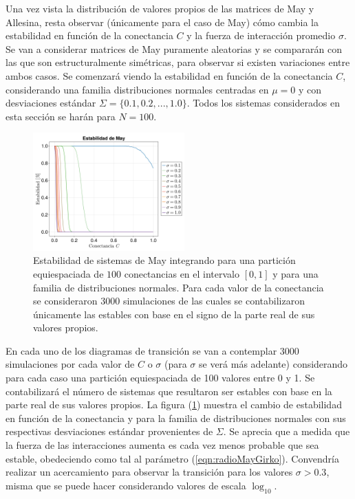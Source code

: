 Una vez vista la distribución de valores propios de las matrices de May y Allesina, resta observar (únicamente para el caso de May) cómo cambia la estabilidad en función de la conectancia $C$ y la fuerza de interacción promedio $\sigma$. Se van a considerar matrices de May puramente aleatorias y se compararán con las que son estructuralmente simétricas, para observar si existen variaciones entre ambos casos. Se comenzará viendo la estabilidad en función de la conectancia $C$, considerando una familia distribuciones normales centradas en $\mu=0$ y con desviaciones estándar $\Sigma = \{0.1,0.2,...,1.0\}$. Todos los sistemas considerados en esta sección se harán para $N=100$. 
\begin{figure} \vspace{-30pt} \begin{center}
		\includegraphics[width=0.52\textwidth]{../Imagenes/TransicionMayDirLin} 
	\end{center} 
	\vspace{-20pt} 
	\caption{Estabilidad de sistemas de May integrando para una partición equiespaciada de  $100$ conectancias en el intervalo $[0,1]$ y para una familia de distribuciones normales. Para cada valor de la conectancia se consideraron $3000$ simulaciones de las cuales se contabilizaron únicamente las estables con base en el signo de la parte real de sus valores propios.} 
	\vspace{-10pt}
	\label{fig:TransicionMayDirLin}
\end{figure} 
En cada uno de los diagramas de transición se van a contemplar $3000$ simulaciones por cada valor de $C$ o $\sigma$ (para $\sigma$ se verá más adelante) considerando para cada caso una partición equiespaciada de 100 valores entre 0 y 1. Se contabilizará el número de sistemas que resultaron ser estables con base en la parte real de sus valores propios. La figura (\ref{fig:TransicionMayDirLin}) muestra el cambio de estabilidad en función de la conectancia y para la familia de distribuciones normales con sus respectivas desviaciones estándar provenientes de $\Sigma$. Se aprecia que a medida que la fuerza de las interacciones aumenta es cada vez menos probable que sea estable, obedeciendo como tal al parámetro (\ref{eqn:radioMayGirko}). Convendría realizar un acercamiento para observar la transición para los valores $\sigma>0.3$, misma que se puede hacer considerando valores de escala $\log_{10}$.\\
